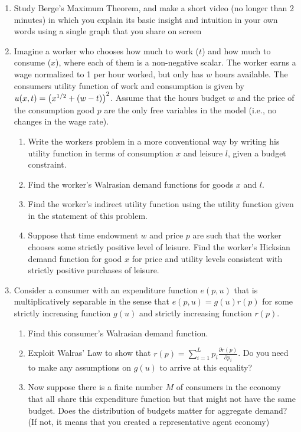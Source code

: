 \documentclass[12pt]{article}
\begin{document}
\begin{enumerate}
	\item Study Berge’s Maximum Theorem, and make a short video (no longer than 2 minutes) in which you explain its basic insight and intuition in your own words using a single graph that you share on screen
	\item Imagine a worker who chooses how much to work ($t$) and how much to consume ($x$), where each of them is a non-negative scalar. The worker earns a wage normalized to 1 per hour worked, but only has $w$ hours available. The consumers utility function of work and consumption is given by $u(x,t) = \left( x^{1/2} + (w-t)\right)^2$. Assume that the hours budget $w$ and the price of the consumption good $p$ are the only free variables in the model (i.e., no changes in the wage rate).
	\begin{enumerate}
		\item Write the workers problem in a more conventional way by writing his utility function in terms of consumption $x$ and leisure $l$, given a budget constraint.
		\item Find the worker’s Walrasian demand functions for goods $x$ and $l$.
		\item Find the worker’s indirect utility function using the utility function given in the statement of this problem.
		\item Suppose that time endowment $w$ and price $p$ are such that the worker chooses some strictly positive level of leisure. Find the worker’s Hicksian demand function for good $x$ for price and utility levels consistent with strictly positive purchases of leisure.
	\end{enumerate}
	\item Consider a consumer with an expenditure function $e(p,u)$ that is multiplicatively separable in the sense that $e(p,u)=g(u)r(p)$ for some strictly increasing function $g(u)$ and strictly increasing function $r(p)$.
	\begin{enumerate}
		\item Find this consumer's Walrasian demand function.
		\item Exploit Walras' Law to show that $r(p) = \sum_{i=1}^L p_i \frac{\partial r(p)}{\partial p_i}$. Do you need to make any assumptions on $g(u)$ to arrive at this equality?
		\item Now suppose there is a finite number $M$ of consumers in the economy that all share this expenditure function but that might not have the same budget. Does the distribution of budgets matter for aggregate demand? (If not, it means that you created a representative agent economy)

\end{enumerate}
\end{enumerate}
\end{document}
